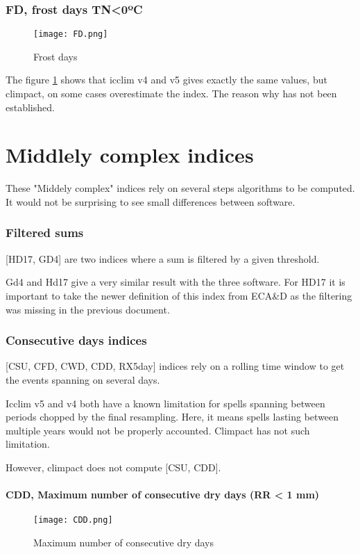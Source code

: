\documentclass[a4paper,11pt]{article}
\begin{document}
\section{FD, frost days TN<0ºC}

    \begin{figure}[!hbt]
        \centering
        \texttt{[image: FD.png]}
        \caption{Frost days}
        \label{figure/fd}
    \end{figure}
    
    The figure \ref{figure/fd} shows that icclim v4 and v5 gives exactly the same values, but climpact, on some cases overestimate the index.
    The reason why has not been established.
    

\part{Middlely complex indices}
    These "Middely complex" indices rely on several steps algorithms
    to be computed.
    It would not be surprising to see small differences between software.

\section{Filtered sums}
    [HD17, GD4] are two indices where a sum is filtered by a given threshold.

    Gd4 and Hd17 give a very similar result with the three software.
    For HD17 it is important to take the newer definition of this index from ECA\&D as the filtering was missing in the previous document.

\section{Consecutive days indices} \label{section/consecutive_days}
    [CSU, CFD, CWD, CDD, RX5day] indices rely on a rolling time window to get the events spanning on several days.

    Icclim v5 and v4 both have a known limitation for spells spanning between periods chopped by the final resampling. Here, it means spells lasting between multiple years would not be properly accounted.
    Climpact has not such limitation.

    However, climpact does not compute [CSU, CDD].

\subsection{CDD, Maximum number of consecutive dry days (RR < 1 mm)}
    \begin{figure}[!hbt]
        \centering
        \texttt{[image: CDD.png]}
        \caption{Maximum number of consecutive dry days}
        \label{figure/cdd}
    \end{figure}
\end{document}
